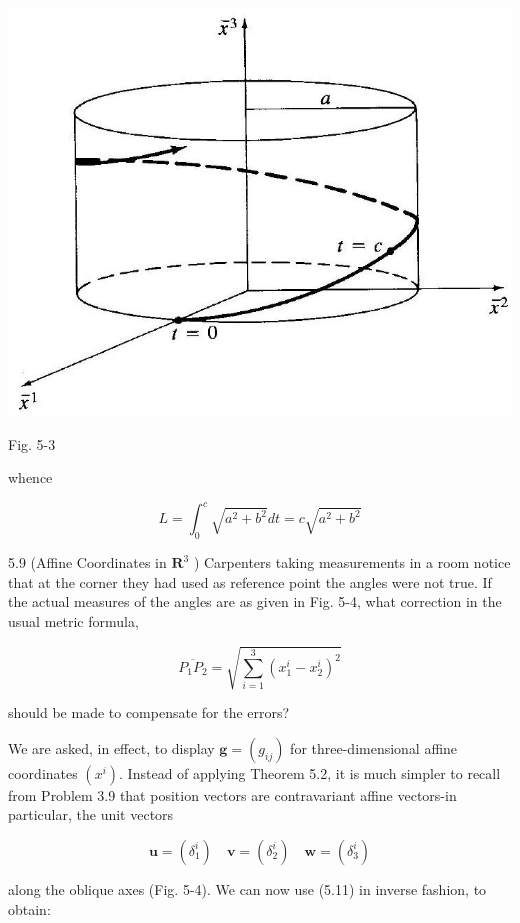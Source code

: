 \documentclass[10pt]{article}
\begin{document}
\begin{center}
\includegraphics[max width=\textwidth]{2024_04_03_41f90be4f896e21f0dc9g-070(1)}
\end{center}

Fig. 5-3

whence

$$
L=\int_{0}^{c} \sqrt{a^{2}+b^{2}} d t=c \sqrt{a^{2}+b^{2}}
$$

5.9 (Affine Coordinates in $\mathbf{R}^{3}$ ) Carpenters taking measurements in a room notice that at the corner they had used as reference point the angles were not true. If the actual measures of the angles are as given in Fig. 5-4, what correction in the usual metric formula,

$$
\overline{P_{1} P_{2}}=\sqrt{\sum_{i=1}^{3}\left(x_{1}^{i}-x_{2}^{i}\right)^{2}}
$$

should be made to compensate for the errors?

We are asked, in effect, to display $\mathbf{g}=\left(g_{i j}\right)$ for three-dimensional affine coordinates $\left(x^{i}\right)$. Instead of applying Theorem 5.2, it is much simpler to recall from Problem 3.9 that position vectors are contravariant affine vectors-in particular, the unit vectors

$$
\mathbf{u}=\left(\delta_{1}^{i}\right) \quad \mathbf{v}=\left(\delta_{2}^{i}\right) \quad \mathbf{w}=\left(\delta_{3}^{i}\right)
$$

along the oblique axes (Fig. 5-4). We can now use (5.11) in inverse fashion, to obtain:
\end{document}
